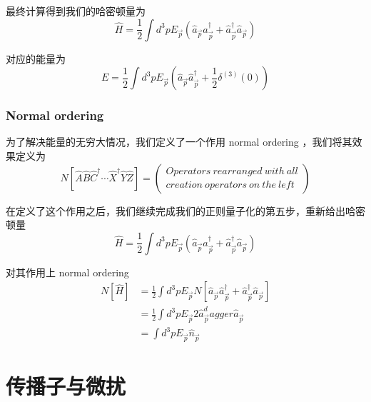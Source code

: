 \documentclass{article}
\begin{document}
\begin{itemize}
    最终计算得到我们的哈密顿量为
    \begin{equation*}
        \hat{H} = \frac{1}{2}\int d^3p E_{\vec{p}}\left(\hat{a}_{\vec{p}}\hat{a}_{\vec{p}}^\dagger + \hat{a}_{\vec{p}}^\dagger \hat{a}_{\vec{p}}\right)
    \end{equation*}

    对应的能量为
    \begin{equation*}
        E = \frac{1}{2}\int d^3p E_{\vec{p}}\left(\hat{a}_{\vec{p}}\hat{a}_{\vec{p}}^\dagger + \frac{1}{2}\delta^{(3)}(0)\right)
    \end{equation*}
\end{itemize}

\subsubsection{Normal ordering}
为了解决能量的无穷大情况，我们定义了一个作用 normal ordering ，我们将其效果定义为
\begin{equation*}
    N\left[\hat{A}\hat{B}\hat{C}^\dagger\cdots \hat{X}^\dagger\hat{Y}\hat{Z}\right] = 
    \begin{pmatrix}
        Operators\ rearranged\ with\ all \\
        creation\ operators\ on\ the\ left 
    \end{pmatrix}
\end{equation*}

在定义了这个作用之后，我们继续完成我们的正则量子化的第五步，重新给出哈密顿量
\begin{equation*}
    \hat{H} = \frac{1}{2}\int d^3p E_{\vec{p}}\left(\hat{a}_{\vec{p}}\hat{a}_{\vec{p}}^\dagger + \hat{a}_{\vec{p}}^\dagger \hat{a}_{\vec{p}}\right)
\end{equation*}

对其作用上 normal ordering
\begin{align*}
    N\left[\hat{H}\right] &= \frac{1}{2}\int d^3p E_{\vec{p}} N\left[\hat{a}_{\vec{p}}\hat{a}_{\vec{p}}^\dagger + \hat{a}_{\vec{p}}^\dagger \hat{a}_{\vec{p}}\right] \\
    &= \frac{1}{2}\int d^3p E_{\vec{p}}2\hat{a}_{\vec{p}}^dagger\hat{a}_{\vec{p}} \\
    &=\int d^3 p E_{\vec{p}} \hat{n}_{\vec{p}}
\end{align*}


\section{传播子与微扰}
\end{document}
